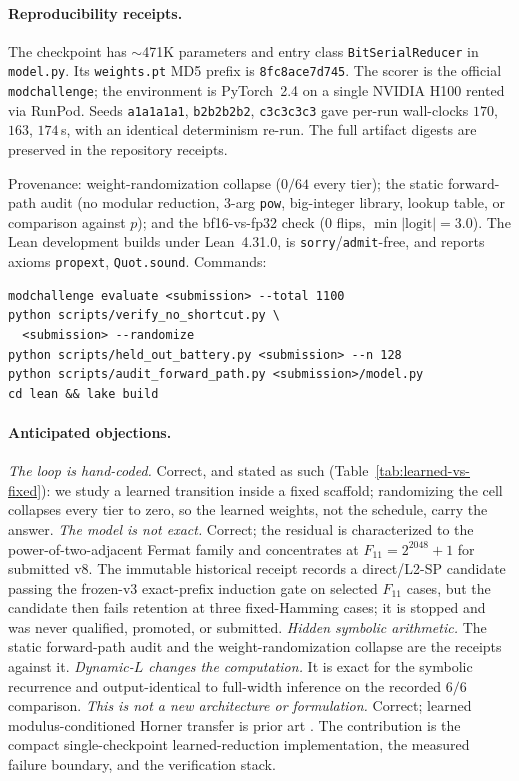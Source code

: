 \documentclass[11pt]{article}
\begin{document}
\paragraph{Reproducibility receipts.}
The checkpoint has $\sim$471K parameters and entry class
\texttt{BitSerial\allowbreak Reducer} in \texttt{model.py}. Its \texttt{weights.pt} MD5 prefix is
\texttt{8fc8ace7d745}. The scorer is the official \texttt{modchallenge}; the
environment is PyTorch~2.4 on a single NVIDIA H100 rented via RunPod. Seeds
\texttt{a1a1a1a1}, \texttt{b2b2b2b2}, \texttt{c3c3c3c3} gave per-run wall-clocks
$170$, $163$, $174$\,s, with an identical determinism re-run. The full artifact
digests are preserved in the repository receipts.

Provenance: weight-randomization collapse ($0/64$ every tier); the static
forward-path audit (no modular reduction, 3-arg \texttt{pow}, big-integer library,
lookup table, or comparison against $p$); and the bf16-vs-fp32 check ($0$ flips,
$\min|\text{logit}|
= 3.0$). The Lean development builds under Lean~4.31.0, is
\texttt{sorry}/\texttt{admit}-free, and reports axioms \texttt{propext},
\texttt{Quot.sound}. Commands:
\begin{verbatim}
modchallenge evaluate <submission> --total 1100
python scripts/verify_no_shortcut.py \
  <submission> --randomize
python scripts/held_out_battery.py <submission> --n 128
python scripts/audit_forward_path.py <submission>/model.py
cd lean && lake build
\end{verbatim}

\paragraph{Anticipated objections.}
\emph{The loop is hand-coded.} Correct, and stated as such (Table~\ref{tab:learned-vs-fixed}):
we study a learned transition inside a fixed scaffold; randomizing the cell collapses
every tier to zero, so the learned weights, not the schedule, carry the answer.
\emph{The model is not exact.} Correct; the residual is characterized to the
power-of-two-adjacent Fermat family and concentrates at $F_{11}=2^{2048}+1$ for
submitted v8. The immutable historical receipt records a direct/L2-SP candidate
passing the frozen-v3 exact-prefix induction gate on selected $F_{11}$ cases, but
the candidate then fails retention at three fixed-Hamming
cases; it is stopped and was never qualified, promoted, or submitted.
\emph{Hidden symbolic arithmetic.} The static forward-path audit and the
weight-randomization collapse are the receipts against it.
\emph{Dynamic-$L$ changes the computation.} It is exact for the symbolic recurrence
and output-identical to full-width inference on the recorded $6/6$ comparison.
\emph{This is not a new architecture or formulation.} Correct; learned
modulus-conditioned Horner transfer is prior art \citep{xllent2026horner}. The
contribution is the compact single-checkpoint learned-reduction implementation,
the measured failure boundary, and the verification stack.
\end{document}
